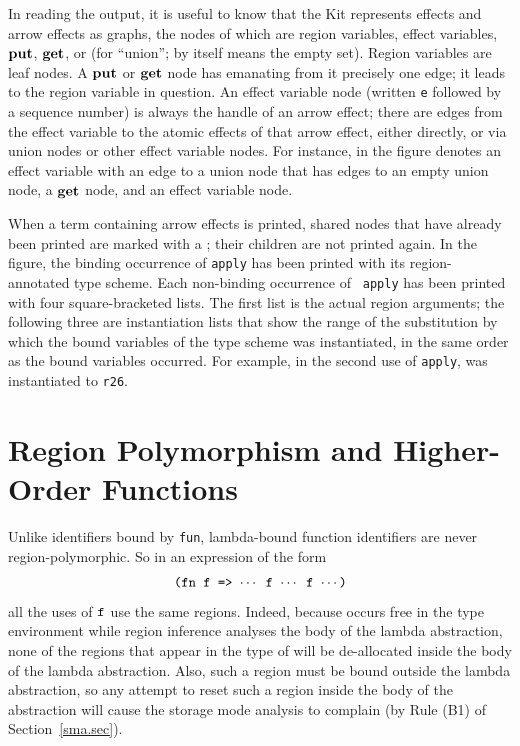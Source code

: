 \documentclass[12pt]{book}
\begin{document}
In reading the output, it is useful to know
that the Kit represents effects and arrow effects as graphs, the nodes
of which are region variables, effect variables, $\mathop{\bf put}\nolimits$, $\mathop{\bf get}\nolimits$, or
 (for ``union'';  by itself means the empty set).
Region variables are leaf nodes. A $\mathop{\bf put}\nolimits$ or $\mathop{\bf get}\nolimits$ node has emanating
from it precisely one edge; it leads to the region variable in
question.  An effect variable node (written {\tt e} followed by a
sequence number) is always the handle of an arrow effect; there are
edges from the effect variable to the atomic effects of that arrow
effect, either directly, or via union nodes or other effect variable
nodes.  For instance,  in the figure
denotes an effect variable with an edge to a union node that has edges
to an empty union node, a $\mathop{\bf get}\nolimits$ node, and an effect variable node.

When a term containing arrow effects is printed, shared nodes that
have already been printed are marked with a ; their children
are not printed again. 
In the figure, the binding occurrence of {\tt apply} has been printed
with its region-annotated type scheme. Each non-binding occurrence of {\tt
  apply} has been printed with four square-bracketed lists. The first
list is the actual region arguments; the following three are
instantiation lists that show the range of the substitution by
which the bound variables of the type scheme was instantiated, in the
same order as the bound variables occurred.  For example, in the
second use of {\tt apply},  was instantiated to {\tt r26}.

\section{Region Polymorphism and Higher-Order Functions}
Unlike identifiers bound by {\tt fun}, lambda-bound function
identifiers are never region-polymorphic. So in an expression of the
form
$$\hbox{\tt (fn f => $\cdots$ f $\cdots$ f $\cdots$)}$$
all the uses of $\hbox{\tt f}$ use the same regions. Indeed, because  occurs
free in the type environment while region inference analyses the body
of the lambda abstraction, none of the regions that appear in the type
of  will be de-allocated inside the body of the lambda
abstraction. Also, such a region must be bound outside the lambda
abstraction, so any attempt to reset such a region inside the body of
the abstraction will cause the storage mode analysis to complain (by
Rule (B1) of Section~\ref{sma.sec}).
\end{document}
